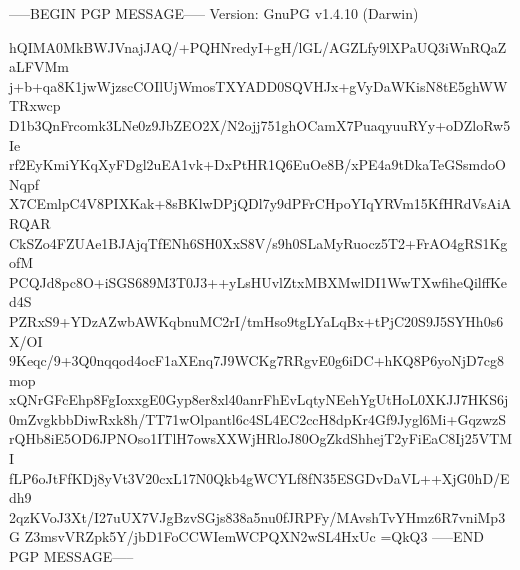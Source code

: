 -----BEGIN PGP MESSAGE-----
Version: GnuPG v1.4.10 (Darwin)

hQIMA0MkBWJVnajJAQ/+PQHNredyI+gH/lGL/AGZLfy9lXPaUQ3iWnRQaZaLFVMm
j+b+qa8K1jwWjzscCOIlUjWmosTXYADD0SQVHJx+gVyDaWKisN8tE5ghWWTRxwcp
D1b3QnFrcomk3LNe0z9JbZEO2X/N2ojj751ghOCamX7PuaqyuuRYy+oDZloRw5Ie
rf2EyKmiYKqXyFDgl2uEA1vk+DxPtHR1Q6EuOe8B/xPE4a9tDkaTeGSsmdoONqpf
X7CEmlpC4V8PIXKak+8sBKlwDPjQDl7y9dPFrCHpoYIqYRVm15KfHRdVsAiARQAR
CkSZo4FZUAe1BJAjqTfENh6SH0XxS8V/s9h0SLaMyRuocz5T2+FrAO4gRS1KgofM
PCQJd8pc8O+iSGS689M3T0J3++yLsHUvlZtxMBXMwlDI1WwTXwfiheQilffKed4S
PZRxS9+YDzAZwbAWKqbnuMC2rI/tmHso9tgLYaLqBx+tPjC20S9J5SYHh0s6X/OI
9Keqc/9+3Q0nqqod4ocF1aXEnq7J9WCKg7RRgvE0g6iDC+hKQ8P6yoNjD7cg8mop
xQNrGFcEhp8FgIoxxgE0Gyp8er8xl40anrFhEvLqtyNEehYgUtHoL0XKJJ7HKS6j
0mZvgkbbDiwRxk8h/TT71wOlpantl6c4SL4EC2ccH8dpKr4Gf9Jygl6Mi+GqzwzS
rQHb8iE5OD6JPNOso1ITlH7owsXXWjHRloJ80OgZkdShhejT2yFiEaC8Ij25VTMI
fLP6oJtFfKDj8yVt3V20cxL17N0Qkb4gWCYLf8fN35ESGDvDaVL++XjG0hD/Edh9
2qzKVoJ3Xt/I27uUX7VJgBzvSGjs838a5nu0fJRPFy/MAvshTvYHmz6R7vniMp3G
Z3msvVRZpk5Y/jbD1FoCCWIemWCPQXN2wSL4HxUc
=QkQ3
-----END PGP MESSAGE-----
